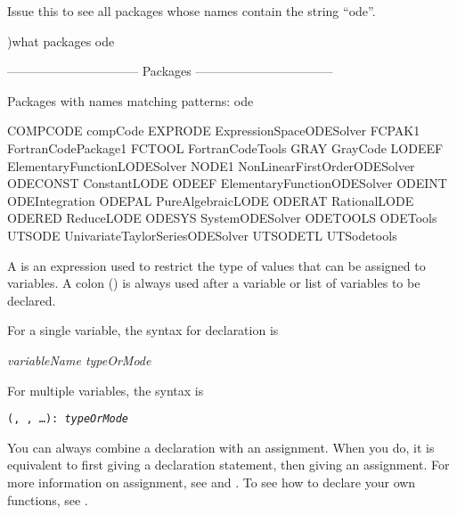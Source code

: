 \begin{xtc}
\begin{xtccomment}
Issue this to see all packages whose names contain the string ``ode''.
\end{xtccomment}
\begin{spadsrc}
)what packages ode
\end{spadsrc}
\begin{SysCmdOutput}
-------------------------------- Packages ---------------------------------

Packages with names matching patterns:
     ode 

 COMPCODE compCode                     EXPRODE  ExpressionSpaceODESolver
 FCPAK1   FortranCodePackage1          FCTOOL   FortranCodeTools
 GRAY     GrayCode                     LODEEF   ElementaryFunctionLODESolver
 NODE1    NonLinearFirstOrderODESolver  ODECONST ConstantLODE
 ODEEF    ElementaryFunctionODESolver  ODEINT   ODEIntegration
 ODEPAL   PureAlgebraicLODE            ODERAT   RationalLODE
 ODERED   ReduceLODE                   ODESYS   SystemODESolver
 ODETOOLS ODETools
 UTSODE   UnivariateTaylorSeriesODESolver
 UTSODETL UTSodetools
\end{SysCmdOutput}
\end{xtc}

%
A  is an expression used
to restrict the type of values that can be assigned to variables.
A colon (\spadSyntax{:}) is always used after a variable or
list of variables to be declared.

\beginImportant
For a single variable, the syntax for declaration is
\begin{center}
{\it variableName \spad{:} typeOrMode}
\end{center}
For multiple variables, the syntax is
\begin{center}
{\tt (, , \ldots {}): {\it typeOrMode}}
\end{center}
\endImportant

You can always combine a declaration with an assignment.
When you do, it is equivalent to first giving a declaration statement,
then giving an assignment.
For more information on assignment, see
 and
.
To see how to declare your own functions, see
.

